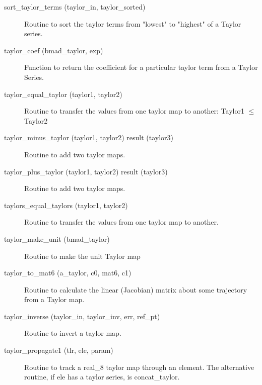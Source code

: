 \begin{description}
\label{r:sort.taylor.terms}
\item[sort_taylor_terms (taylor_in, taylor_sorted)] \Newline
Routine to sort the taylor terms from "lowest" to "highest" of a
Taylor series.

\label{r:taylor.coef}
\item[taylor_coef (bmad_taylor, exp)] \Newline 
Function to return the coefficient for a particular taylor term from a
Taylor Series.

\label{r:taylor.equal.taylor}
\item[taylor_equal_taylor (taylor1, taylor2)] \Newline
Routine to transfer the values from one taylor map to another:
Taylor1 $\le$ Taylor2

\label{r:taylor.minus.taylor}
\item[taylor_minus_taylor (taylor1, taylor2) result (taylor3)] \Newline 
Routine to add two taylor maps.

\label{r:taylor.plus.taylor}
\item[taylor_plus_taylor (taylor1, taylor2) result (taylor3)] \Newline 
Routine to add two taylor maps.

\label{r:taylors.equal.taylors}
\item[taylors_equal_taylors (taylor1, taylor2)] \Newline 
Routine to transfer the values from one taylor map to another.

\label{r:taylor.make.unit}
\item[taylor_make_unit (bmad_taylor)] \Newline
Routine to make the unit Taylor map

\label{r:taylor.to.mat6}
\item[taylor_to_mat6 (a_taylor, c0, mat6, c1)] \Newline
Routine to calculate the linear (Jacobian) matrix about some
trajectory from a Taylor map.

\label{r:taylor.inverse}
\item[taylor_inverse (taylor_in, taylor_inv, err, ref_pt)] \Newline
Routine to invert a taylor map. 

\label{r:taylor.propagate1}
\item[taylor_propagate1 (tlr, ele, param)] \Newline
Routine to track a real_8 taylor map through an element. 
The alternative routine, if ele has a taylor series, is concat_taylor. 


\end{description}
